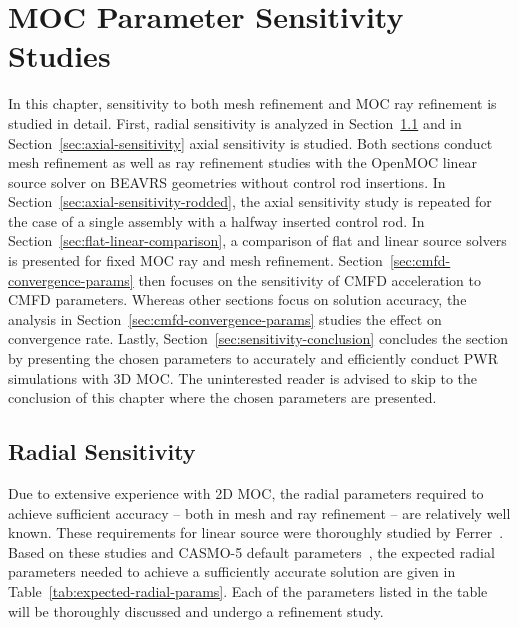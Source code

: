 \chapter{MOC Parameter Sensitivity Studies}
\label{chap:moc-sensitivity}

In this chapter, sensitivity to both mesh refinement and \ac{MOC} ray refinement is studied in detail. First, radial sensitivity is analyzed in Section~\ref{sec:radial-sensitivity} and in Section~\ref{sec:axial-sensitivity} axial sensitivity is studied. Both sections conduct mesh refinement as well as ray refinement studies with the OpenMOC linear source solver on BEAVRS geometries without control rod insertions. In Section~\ref{sec:axial-sensitivity-rodded}, the axial sensitivity study is repeated for the case of a single assembly with a halfway inserted control rod. In Section~\ref{sec:flat-linear-comparison}, a comparison of flat and linear source solvers is presented for fixed \ac{MOC} ray and mesh refinement. Section~\ref{sec:cmfd-convergence-params} then focuses on the sensitivity of \ac{CMFD} acceleration to \ac{CMFD} parameters. Whereas other sections focus on solution accuracy, the analysis in Section~\ref{sec:cmfd-convergence-params} studies the effect on convergence rate. Lastly, Section~\ref{sec:sensitivity-conclusion} concludes the section by presenting the chosen parameters to accurately and efficiently conduct \ac{PWR} simulations with 3D \ac{MOC}. The uninterested reader is advised to skip to the conclusion of this chapter where the chosen parameters are presented.

\section{Radial Sensitivity}
\label{sec:radial-sensitivity}

Due to extensive experience with 2D \ac{MOC}, the radial parameters required to achieve sufficient accuracy -- both in mesh and ray refinement -- are relatively well known. These requirements for linear source were thoroughly studied by Ferrer~\cite{ferrer2012linear}. Based on these studies and CASMO-5 default parameters~\cite{rhodes2006casmo}, the expected radial parameters needed to achieve a sufficiently accurate solution are given in Table~\ref{tab:expected-radial-params}. Each of the parameters listed in the table will be thoroughly discussed and undergo a refinement study.

